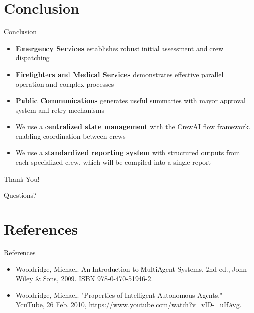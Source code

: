 \documentclass{beamer}
\begin{document}
\section{Conclusion}
\begin{frame}{Conclusion}
    \begin{itemize}
        \item \textbf{Emergency Services} establishes robust initial assessment and crew dispatching
        \item \textbf{Firefighters and Medical Services} demonstrates effective parallel operation and complex processes
        \item \textbf{Public Communications} generates useful summaries with mayor approval system and retry mechanisms
        \item We use a \textbf{centralized state management} with the CrewAI flow framework, enabling coordination between crews
        \item We use a \textbf{standardized reporting system} with structured outputs from each specialized crew, which will be compiled into a single report
    \end{itemize}
\end{frame}

\begin{frame}
    \centering
    \vspace{2cm}
    {\Large Thank You!}
    \vspace{1cm}
    
    {\large Questions?}
\end{frame}

\section{References}
\begin{frame}{References}
    \begin{itemize}
        \item Wooldridge, Michael. An Introduction to MultiAgent Systems. 2nd ed., John Wiley \& Sons, 2009. ISBN 978-0-470-51946-2.
        \item Wooldridge, Michael. "Properties of Intelligent Autonomous Agents." YouTube, 26 Feb. 2010, \url{https://www.youtube.com/watch?v=vID-_uIfAvg}.
    \end{itemize}
\end{frame}
\end{document}
